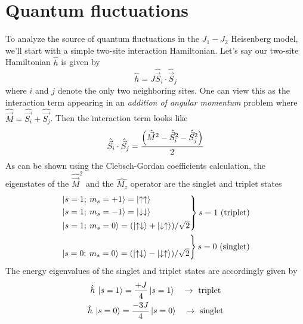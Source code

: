 \documentclass[../journal_main.tex]{subfiles}
\begin{document}
\section{Quantum fluctuations}
To analyze the source of quantum fluctuations in the $J_1-J_2$ Heisenberg model, we'll start with a simple two-site interaction Hamiltonian. Let's say our two-site Hamiltonian $\hat{h}$ is given by 
\begin{equation}
    \hat{h} = J \hat{\vec{S}}_i \cdot \hat{\vec{S}}_j
\end{equation}
where $i$ and $j$ denote the only two neighboring sites. One can view this as the interaction term appearing in an \textit{addition of angular momentum} problem where $\hat{\vec{M}} = \hat{\vec{S_i}} + \hat{\vec{S_j}}$. Then the interaction term looks like
\begin{equation}
    \hat{\vec{S}}_i \cdot \hat{\vec{S}}_j = \frac{\qty(\hat{\vec{M}}^2 -  \hat{\vec{S}}_i^2 - \hat{\vec{S}}_j^2)}{2}
\end{equation}
As can be shown using the Clebsch-Gordan coefficients calculation, the eigenstates of the $\hat{\vec{M}}^2$ and the $\hat{M_z}$ operator are the singlet and triplet states
\begin{subequations}
    \begin{align}
        \begin{rcases*}
            \ket{s = 1; \: m_s = +1} = \ket{\uparrow \uparrow} \\
            \ket{s = 1; \: m_s = -1} = \ket{\downarrow \downarrow} \\
            \ket{s = 1; \: m_s = 0} = (\ket{\uparrow \downarrow} + \ket{\downarrow \uparrow})/\sqrt{2}
            \end{rcases*} s=1\text{ (triplet)} \\
        \begin{rcases*}
            \\
            \ket{s = 0; \: m_s = 0} = (\ket{\uparrow \downarrow} - \ket{\downarrow \uparrow})/\sqrt{2}
            \\ 
            \end{rcases*} s=0\text{ (singlet)}
    \end{align}    
\end{subequations}
The energy eigenvalues of the singlet and triplet states are accordingly given by
\begin{subequations}
\begin{gather}
    \hat{h} \: \ket{s = 1} = \frac{+J}{4} \ket{s = 1} \quad \rightarrow \text{ triplet} \\
    \hat{h} \: \ket{s = 0} = \frac{-3J}{4} \ket{s = 0} \quad \rightarrow \text{ singlet}
\end{gather}
\end{subequations}
\end{document}
